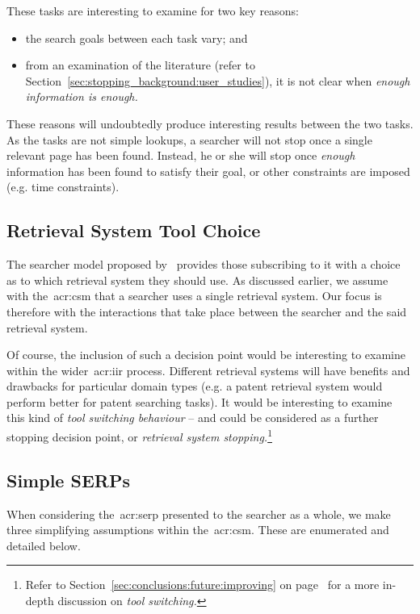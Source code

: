 These tasks are interesting to examine for two key reasons:

\begin{itemize}
    \item{the search goals between each task vary; and}
    \item{from an examination of the literature (refer to Section~\ref{sec:stopping_background:user_studies}), it is not clear when \emph{enough information is enough.}}
\end{itemize}

These reasons will undoubtedly produce interesting results between the two tasks. As the tasks are not simple lookups, a searcher will not stop once a single relevant page has been found. Instead, he or she will stop once \emph{enough}~\citep{zach2005enough_is_enough} information has been found to satisfy their goal, or other constraints are imposed (e.g. time constraints).

\subsection{Retrieval System Tool Choice}\label{sec:csm:assumptions:tool}
The searcher model proposed by~\cite{thomas2014modelling_behaviour} provides those subscribing to it with a choice as to which retrieval system they should use. As discussed earlier, we assume with the~\gls{acr:csm} that a searcher uses a single retrieval system. Our focus is therefore with the interactions that take place between the searcher and the said retrieval system.

Of course, the inclusion of such a decision point would be interesting to examine within the wider~\gls{acr:iir} process. Different retrieval systems will have benefits and drawbacks for particular domain types (e.g. a patent retrieval system would perform better for patent searching tasks). It would be interesting to examine this kind of \emph{tool switching behaviour} -- and could be considered as a further stopping decision point, or \emph{retrieval system stopping.}\footnote{Refer to Section~\ref{sec:conclusions:future:improving} on page~\pageref{sec:conclusions:future:improving} for a more in-depth discussion on \emph{tool switching.}}

\subsection{Simple SERPs}
When considering the~\gls{acr:serp} presented to the searcher as a whole, we make three simplifying assumptions within the~\gls{acr:csm}. These are enumerated and detailed below.

